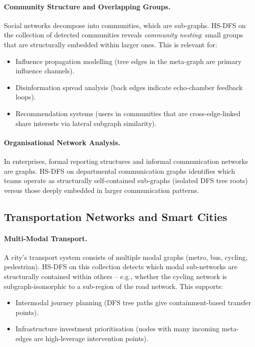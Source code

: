 ﻿\documentclass[12pt,a4paper]{article}
\theoremstyle{plain}
\theoremstyle{definition}
\theoremstyle{remark}
\begin{document}
	\paragraph{Community Structure and Overlapping Groups.}
	Social networks decompose into communities, which are sub-graphs.  HS-DFS
	on the collection of detected communities reveals \emph{community nesting}:
	small groups that are structurally embedded within larger ones.  This is
	relevant for:
	\begin{itemize}
		\item Influence propagation modelling (tree edges in the meta-graph
		are primary influence channels).
		\item Disinformation spread analysis (back edges indicate echo-chamber
		feedback loops).
		\item Recommendation systems (users in communities that are cross-edge-linked
		share interests via lateral subgraph similarity).
	\end{itemize}
	
	\paragraph{Organisational Network Analysis.}
	In enterprises, formal reporting structures and informal communication
	networks are graphs.  HS-DFS on departmental communication graphs identifies
	which teams operate as structurally self-contained sub-graphs (isolated DFS
	tree roots) versus those deeply embedded in larger communication patterns.
	
	\subsection{Transportation Networks and Smart Cities}
	\label{sec:transport}
	
	\paragraph{Multi-Modal Transport.}
	A city's transport system consists of multiple modal graphs (metro, bus,
	cycling, pedestrian).  HS-DFS on this collection detects which modal
	sub-networks are structurally contained within others -- e.g., whether the
	cycling network is subgraph-isomorphic to a sub-region of the road network.
	This supports:
	\begin{itemize}
		\item Intermodal journey planning (DFS tree paths give containment-based
		transfer points).
		\item Infrastructure investment prioritisation (nodes with many incoming
		meta-edges are high-leverage intervention points).
	\end{itemize}
	
\end{document}
